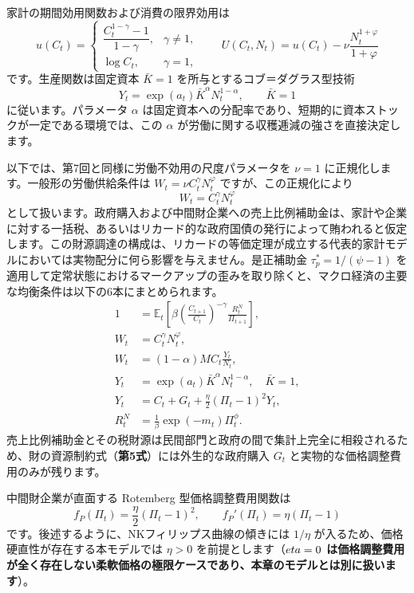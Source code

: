\documentclass[
  japanese,
  lualatex,
  ja=standard,
  12pt,
  a4paper]{ltjsarticle}
\begin{document}
家計の期間効用関数および消費の限界効用は \[
u(C_t)
=
\begin{cases}
\dfrac{C_t^{1-\gamma}-1}{1-\gamma}, & \gamma\neq1,\\[6pt]
\log C_t, & \gamma=1,
\end{cases}
\qquad
U(C_t,N_t)=u(C_t)-\nu\frac{N_t^{1+\varphi}}{1+\varphi}
\] です。生産関数は固定資本 \(\bar{K}=1\)
を所与とするコブ＝ダグラス型技術 \[
Y_t=\exp(a_t)\bar K^\alpha N_t^{1-\alpha},
\qquad
\bar K=1
\] に従います。パラメータ \(\alpha\)
は固定資本への分配率であり、短期的に資本ストックが一定である環境では、この
\(\alpha\) が労働に関する収穫逓減の強さを直接決定します。

以下では、第7回と同様に労働不効用の尺度パラメータを \(\nu=1\)
に正規化します。一般形の労働供給条件は
\(W_t=\nu C_t^\gamma N_t^\varphi\) ですが、この正規化により \[
W_t=C_t^\gamma N_t^\varphi
\]
として扱います。政府購入および中間財企業への売上比例補助金は、家計や企業に対する一括税、あるいはリカード的な政府国債の発行によって賄われると仮定します。この財源調達の構成は、リカードの等価定理が成立する代表的家計モデルにおいては実物配分に何ら影響を与えません。是正補助金
\(\tau_p^*=1/(\psi-1)\)
を適用して定常状態におけるマークアップの歪みを取り除くと、マクロ経済の主要な均衡条件は以下の6本にまとめられます。
\[
\begin{aligned}
1&=\mathbb{E}_t\left[
\beta\left(\frac{C_{t+1}}{C_t}\right)^{-\gamma}
\frac{R_t^N}{\Pi_{t+1}}
\right],\\
W_t&=C_t^\gamma N_t^\varphi,\\
W_t&=(1-\alpha)MC_t\frac{Y_t}{N_t},\\
Y_t&=\exp(a_t)\bar K^\alpha N_t^{1-\alpha},\quad \bar K=1,\\
Y_t&=C_t+G_t+\frac{\eta}{2}(\Pi_t-1)^2Y_t,\\
R_t^N&=\frac{1}{\beta}\exp(-m_t)\Pi_t^\phi.
\end{aligned}
\]
売上比例補助金とその税財源は民間部門と政府の間で集計上完全に相殺されるため、財の資源制約式（\textbf{第5式}）には外生的な政府購入
\(G_t\) と実物的な価格調整費用のみが残ります。

\Needspace{0.20\textheight}

中間財企業が直面する Rotemberg 型価格調整費用関数は \[
f_P(\Pi_t)=\frac{\eta}{2}(\Pi_t-1)^2,
\qquad
f_P'(\Pi_t)=\eta(\Pi_t-1)
\] です。後述するように、NKフィリップス曲線の傾きには \(1/\eta\)
が入るため、価格硬直性が存在する本モデルでは \(\eta>0\)
を前提とします（\textbf{\(\\eta=0\)
は価格調整費用が全く存在しない柔軟価格の極限ケースであり、本章のモデルとは別に扱います}）。
\end{document}
